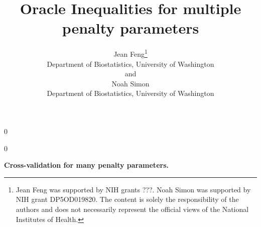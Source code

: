 \documentclass[12pt]{article}
\newcommand{\blind}{0}
\begin{document}
%

\def\spacingset#1{\renewcommand{\baselinestretch}%
{#1}\small\normalsize} \spacingset{1}



\blind
{
  \title{\bf Oracle Inequalities for multiple penalty parameters}
  \author{Jean Feng\thanks{
    Jean Feng was supported by NIH grants ???. %
    Noah Simon was supported by NIH grant DP5OD019820.
    The content is solely the responsibility of the authors and does not necessarily represent the official views of the National Institutes of Health.}\\
    Department of Biostatistics, University of Washington\\
    and \\
    Noah Simon \\
    Department of Biostatistics, University of Washington}
  \maketitle
} \fi

\blind
{
  \bigskip
  \bigskip
  \bigskip
  \begin{center}
    {\LARGE\bf Cross-validation for many penalty parameters.}
\end{center}
  \medskip
} \fi
\end{document}
